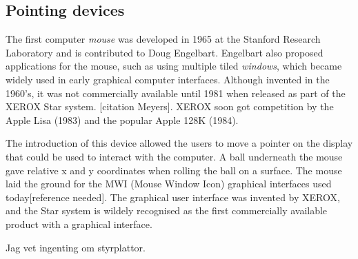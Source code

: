 \subsection{Pointing devices}
The first computer \emph{mouse} was developed in 1965 at the Stanford Research Laboratory and is contributed to Doug Engelbart. Engelbart also proposed applications for the mouse, such as using multiple tiled \emph{windows}, which became widely used in early graphical computer interfaces. Although invented in the 1960's, it was not commercially available until 1981 when released as part of the XEROX Star system. [citation Meyers].
XEROX soon got competition by the Apple Lisa (1983) and the popular Apple 128K (1984).


The introduction of this device allowed the users to move a pointer on the display that could be used to interact with the computer. A ball underneath the mouse gave relative x and y coordinates when rolling the ball on a surface. The mouse laid the ground for the MWI (Mouse Window Icon) graphical interfaces used today[reference needed]. The graphical user interface was invented by XEROX, and the Star system is wildely recognised as the first commercially available product with a graphical interface.




Jag vet ingenting om styrplattor. 


